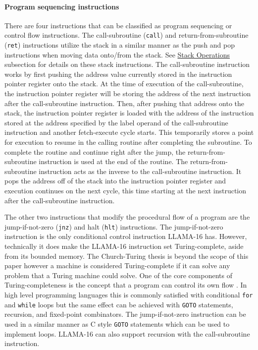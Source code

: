 \documentclass[man,hidelinks,floatsintext]{apa7}
\begin{document}
\paragraph{Program sequencing instructions}
There are four instructions that can be classified as program sequencing or control flow instructions. The call-subroutine (\verb|call|) and return-from-subroutine (\verb|ret|) instructions utilize the stack in a similar manner as the push and pop instructions when moving data onto/from the stack. See \hyperref[sec:stackops]{Stack Operations} subsection for details on these stack instructions. The call-subroutine instruction works by first pushing the address value currently stored in the instruction pointer register onto the stack. At the time of execution of the call-subroutine, the instruction pointer register will be storing the address of the next instruction after the call-subroutine instruction. Then, after pushing that address onto the stack, the instruction pointer register is loaded with the address of the instruction stored at the address specified by the label operand of the call-subroutine instruction and another fetch-execute cycle starts. This temporarily stores a point for execution to resume in the calling routine after completing the subroutine. To complete the routine and continue right after the jump, the return-from-subroutine instruction is used at the end of the routine. The return-from-subroutine instruction acts as the inverse to the call-subroutine instruction. It pops the address off of the stack into the instruction pointer register and execution continues on the next cycle, this time starting at the next instruction after the call-subroutine instruction.\par
The other two instructions that modify the procedural flow of a program are the jump-if-not-zero (\verb|jnz|) and halt (\verb|hlt|) instructions. The jump-if-not-zero instruction is the only conditional control instruction LLAMA-16 has. However, technically it does make the LLAMA-16 instruction set Turing-complete, aside from its bounded memory. The Church-Turing thesis is beyond the scope of this paper however a machine is considered Turing-complete if it can solve any problem that a Turing machine could solve. One of the core components of Turing-completeness is the concept that a program can control its own flow \parencite{turing}. In high level programming languages this is commonly satisfied with conditional \verb|for| and \verb|while| loops but the same effect can be achieved with \verb|GOTO| statements, recursion, and fixed-point combinators. The jump-if-not-zero instruction can be used in a similar manner as C style \verb|GOTO| statements which can be used to implement loops. LLAMA-16 can also support recursion with the call-subroutine instruction.\par
\end{document}
